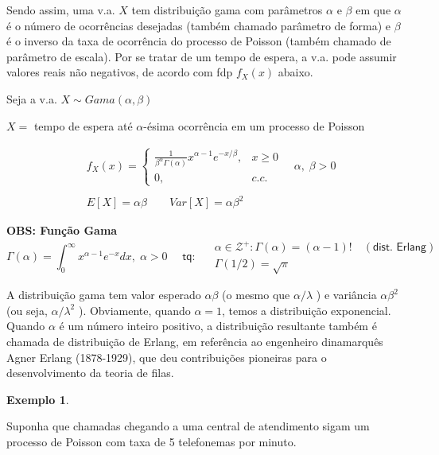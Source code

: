 \documentclass[
]{book}
\theoremstyle{definition}
\theoremstyle{definition}
\newtheorem{example}{Exemplo}[chapter]
\theoremstyle{definition}
\theoremstyle{remark}
\begin{document}
Sendo assim, uma v.a. \(X\) tem distribuição gama com parâmetros \(\alpha\) e \(\beta\) em que \(\alpha\) é o número de ocorrências desejadas (também chamado parâmetro de forma) e \(\beta\) é o inverso da taxa de ocorrência do processo de Poisson (também chamado de parâmetro de escala). Por se tratar de um tempo de espera, a v.a. pode assumir valores reais não negativos, de acordo com fdp \(f_X(x)\) abaixo.

Seja a v.a. \(X \sim Gama(\alpha, \beta)\)

\(X =\) tempo de espera até \(\alpha\)-ésima ocorrência em um processo de Poisson

\begin{align*}
  &{} f_{X}(x) = \left\{
  \begin{array}{rl}
    \frac{1}{\beta^\alpha\Gamma(\alpha)}x^{\alpha -1} e^{-x/\beta}, & x \geq 0\\
    0,           & c.c.
  \end{array}\right.
  \quad \alpha, \; \beta > 0
  \\ \\
  &{} E[X] = \alpha\beta \qquad Var[X] = \alpha\beta^2
\end{align*}

\textbf{OBS: Função Gama}
\[\Gamma(\alpha) = \int_{0}^{\infty} x^{\alpha -1} e^{-x} dx, \; \alpha >0  \quad \textsf{ tq: } \quad \begin{array}{l}
    \alpha \in \mathcal{Z}^{+}: \Gamma(\alpha) = (\alpha-1)! \quad (\textsf{dist. Erlang})\\
    \Gamma(1/2) = \sqrt{\pi}
  \end{array}\]

A distribuição gama tem valor esperado \(\alpha \beta\) (o mesmo que \(\alpha/\lambda\) ) e variância \(\alpha \beta^2\) (ou seja, \(\alpha/\lambda^2\) ).
Obviamente, quando \(\alpha = 1\), temos a distribuição exponencial. Quando \(\alpha\) é um número inteiro positivo, a distribuição resultante também é chamada de distribuição de Erlang, em referência ao engenheiro dinamarquês Agner Erlang (1878-1929), que deu contribuições pioneiras para o desenvolvimento da teoria de filas.

\begin{example}
\protect\hypertarget{exm:unnamed-chunk-9}{}{\label{exm:unnamed-chunk-9} }
\end{example}

Suponha que chamadas chegando a uma central de atendimento sigam um processo de Poisson com taxa de 5 telefonemas por minuto.
\end{document}
